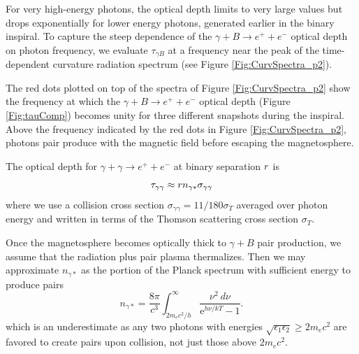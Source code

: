 For very high-energy photons, the optical depth limits to very large
values but drops exponentially for lower energy photons, generated
earlier in the binary inspiral. To capture the steep dependence of the
$\gamma + B \rightarrow e^{+} + e^{-}$ optical depth on photon
frequency, we evaluate $\tau_{\gamma B}$ at a frequency near the peak
of the time-dependent curvature radiation spectrum (see Figure
\ref{Fig:CurvSpectra_p2}).

The red dots plotted on top of the spectra of Figure
\ref{Fig:CurvSpectra_p2} show the frequency at which the $\gamma + B
\rightarrow e^{+} + e^{-}$ optical depth (Figure \ref{Fig:tauComp})
becomes unity for three different snapshots during the inspiral. Above
the frequency indicated by the red dots in Figure
\ref{Fig:CurvSpectra_p2}, photons pair produce with the magnetic field
before escaping the magnetosphere.



The optical depth for $\gamma + \gamma \rightarrow e^{+} + e^{-}$ at
binary separation $r$ is
\begin{equation}
\label{GGoptd}
\tau_{\gamma \gamma} \approx r n_{\gamma*} \sigma_{\gamma \gamma}
\end{equation}
where we use a collision cross section $\sigma_{\gamma \gamma} =
11/180 \sigma_T$ \citep{LithSari:2001, Sven:1987} averaged over photon
energy and written in terms of the Thomson scattering cross section
$\sigma_T$.


Once the magnetosphere becomes optically thick to $\gamma + B$ pair
production, we assume that the radiation plus pair plasma thermalizes.
Then we may approximate $n_{\gamma*}$ as the portion of the Planck
spectrum with sufficient energy to produce pairs
\begin{equation}
\label{nstar}
n_{\gamma*} = \frac{8 \pi }{c^3} \int^{\infty}_{2 m_e c^2/h}{\frac{
    \nu^2 \ d\nu}{ \mbox{e}^{h \nu /kT} -1 } } .
\end{equation}
which is an underestimate as any two photons with energies
$\sqrt{\epsilon_1 \epsilon_2} \geq 2 m_e c^2$ are favored to create
pairs upon collision, not just those above $2m_e c^2$.

